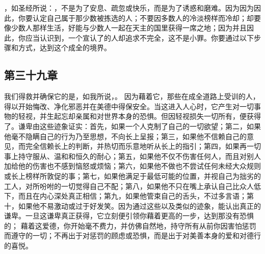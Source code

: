 ，如圣经所说：，不是为了安息、疏忽或快乐，而是为了诱惑和磨难。因为因为因此，你要认定自己属于那少数被拣选的人；不要因多数人的冷淡榜样而冷却；却要像少数人那样生活，好能与少数人一起在天主的国里获得一席之地；因为并且因此，你应当认识到，一个宣认了的人却追求不完全，这不是小罪。你要通过以下步骤和方式，达到这个成全的境界。\par


\subsection{第三十九章}

\par

我们得救并确保它的是，如我所说，。 因为藉着它，那些在成全道路上受训的人，得以开始悔改、净化邪恶并在美德中得保安全。当这进入人心时，它产生对一切事物的轻视，并生起忘却亲属和对世界本身的恐惧。但因轻视损失一切所有，便获得了。谦卑由这些迹象证实：首先，如果一个人克制了自己的一切欲望；第二，如果他毫不隐瞒自己的行为乃至思想，不向长上呈报；第三，如果他不信赖自己的意见，而完全信赖长上的判断，并热切而乐意地听从长上的指引；第四，如果再一切事上持守服从、温和和恒久的耐心；第五，如果他不仅不伤害任何人，而且对别人加给他的伤害也不感到恼怒或烦恼；第六，如果他不做也不尝试任何未经大众规则或长上榜样所敦促的事；第七，如果他满足于最低可能的位置，并视自己为拙劣的工人，对所吩咐的一切觉得自己不配；第八，如果他不只在嘴上承认自己比众人低下，而且在内心深处真正相信；第九，如果他管束自己的舌头，不过多言语；第十，如果他不易激动或过于好发笑。因为通过这些以及类似的迹象，能认出真正的谦卑。一旦这谦卑真正获得，它立刻便引领你藉着更高的一步，达到那没有恐惧的； 藉着这爱德，你开始毫不费力，并仿佛自然地，持守所有从前你因害怕惩罚而遵守的一切；不再出于对惩罚的顾虑或恐惧，而是出于对美善本身的爱和对德行的喜悦。\par


